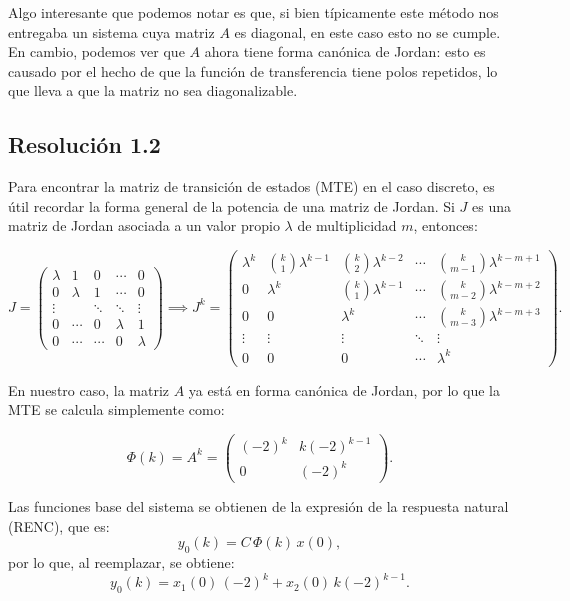 \documentclass[
  11pt,
  letterpaper,
   addpoints,
  answers
  ]{exam}
\begin{document}
\begin{questions}
\begin{solution}
Algo interesante que podemos notar es que, si bien típicamente este método nos entregaba un sistema cuya matriz $A$ es diagonal, en este caso esto no se cumple. En cambio, podemos ver que $A$ ahora tiene forma canónica de Jordan: esto es causado por el hecho de que la función de transferencia tiene polos repetidos, lo que lleva a que la matriz no sea diagonalizable.


\subsection*{Resolución 1.2}

Para encontrar la matriz de transición de estados (MTE) en el caso discreto, es útil recordar la forma general de la potencia de una matriz de Jordan. Si $J$ es una matriz de Jordan asociada a un valor propio $\lambda$ de multiplicidad $m$, entonces:

\[
J=\begin{pmatrix}
\lambda & 1 & 0 & \cdots & 0\\
0 & \lambda & 1 & \cdots & 0\\
\vdots & & \ddots & \ddots & \vdots\\
0 & \cdots & 0 & \lambda & 1\\
0 & \cdots & \cdots & 0 & \lambda
\end{pmatrix}
\implies
J^{k}=\begin{pmatrix}
\lambda^{k} & \binom{k}{1}\lambda^{k-1} & \binom{k}{2}\lambda^{k-2} & \cdots & \binom{k}{m-1}\lambda^{k-m+1}\\
0 & \lambda^{k} & \binom{k}{1}\lambda^{k-1} & \cdots & \binom{k}{m-2}\lambda^{k-m+2}\\
0 & 0 & \lambda^{k} & \cdots & \binom{k}{m-3}\lambda^{k-m+3}\\
\vdots & \vdots & \vdots & \ddots & \vdots\\
0 & 0 & 0 & \cdots & \lambda^{k}
\end{pmatrix}.
\]

En nuestro caso, la matriz $A$ ya está en forma canónica de Jordan, por lo que la MTE se calcula simplemente como:

\begin{equation}
\Phi(k) = A^{k} =
\begin{pmatrix}
(-2)^{k} & k(-2)^{k-1} \\
0        & (-2)^{k}
\end{pmatrix}.
\end{equation}

Las funciones base del sistema se obtienen de la expresión de la respuesta natural (RENC), que es:
\begin{equation}
y_{0}(k) = C\,\Phi(k)\,x(0),
\end{equation}
por lo que, al reemplazar, se obtiene:
\begin{equation}
y_{0}(k) = x_{1}(0)\,(-2)^{k} + x_{2}(0)\,k(-2)^{k-1}.
\end{equation}


\end{solution}
\end{questions}
\end{document}
